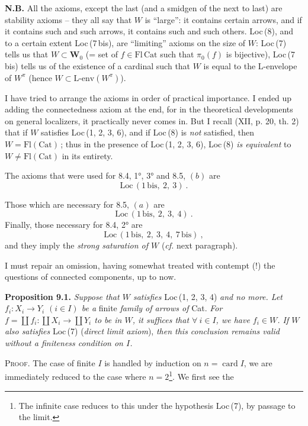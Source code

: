 \documentclass[11pt]{article}
\newcommand{\printedpage}[1]{\marginpar{\footnotesize p.~#1}}
\newcommand{\msp}[1]{\marginpar{\footnotesize [#1]}}
\newcommand{\Cat}{\mathrm{Cat}}
\newcommand{\Fl}{\mathrm{Fl}}
\begin{document}
\textbf{N.B.} All the axioms, except the last (and a smidgen of the next to last) are stability axioms – they all say that $W$ is ``large'': it contains certain arrows, and if it contains such and such arrows, it contains such and such others. Loc\,(8), and to a certain extent Loc\,(7\,bis), are ``limiting'' axioms on the size of $W$: Loc\,(7) tells us that $W\subset\mathbf{W}_0$ (= set %
of $f\in\Fl\,\Cat$ such that $\pi_0(f)$ is bijective), Loc\,(7\,bis) tells us of the existence of a cardinal such that $W$ is equal to the L-envelope of $W^\pi$ (hence $W\subset\text{L-env}(W^\pi)$).

I have tried to arrange the axioms in order of practical importance. I ended up adding the connectedness axiom at the end, for in the theoretical developments on general localizers, %
it practically never comes in. But I recall (XII, p. 20, th. 2) that if $W$ satisfies Loc\,(1, 2, 3, 6), and if Loc\,(8) is \textit{not} satisfied, then $W=\Fl(\Cat)$\,; thus in the presence of Loc\,(1, 2, 3, 6), Loc\,(8) \textit{is equivalent} to $W\neq\Fl(\Cat)$ in its entirety.

\msp{page 119}

The axioms that were used for 8.4, 1°, 3° and 8.5, $(b)$ are
\[
\mathrm{Loc}\,(1\,\mathrm{bis},\ 2,\ 3)\ .
\]

\printedpage{65}

Those which are necessary for 8.5, $(a)$ are
\[
\mathrm{Loc}\,(1\,\mathrm{bis},\ 2,\ 3,\ 4)\ .
\]
Finally, those necessary for 8.4, 2° are
\[
\mathrm{Loc}\,(1\,\mathrm{bis},\ 2,\ 3,\ 4,\ 7\,\mathrm{bis})\ ,
\]
and they imply the \textit{strong saturation of $W$} (\textit{cf.} next paragraph).

I must repair an omission, having somewhat treated with contempt (!) the questions of connected components, up to now.

\textbf{Proposition 9.1.} \textit{Suppose that $W$ satisfies} Loc\,(1, 2, 3, 4) \textit{and no more. Let $f_i : X_i\longrightarrow Y_i$ $(i\in I)$ be a} finite \textit{family of arrows of} Cat. \textit{For $f=\coprod f_i : \coprod X_i\longrightarrow\coprod Y_i$ to be in $W$, it suffices that $\forall\ i\in I$, we have $f_i\in W$. If $W$ also satisfies} Loc\,(7) (\textit{direct limit axiom}), \textit{then this conclusion remains valid without a finiteness condition on $I$.}

\textsc{Proof}. The case of finite $I$ is handled by induction on $n=\operatorname{card}I$, we are immediately reduced to the case where $n=2$\footnote[46]{The infinite case reduces to this under the hypothesis Loc\,(7), by passage to the limit.}. We first see the
\end{document}
